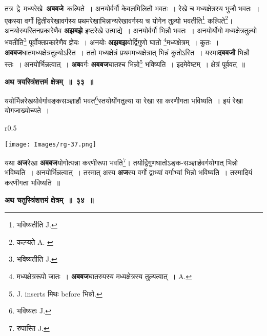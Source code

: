 \documentclass[11pt, openany]{book}
\begin{document}
तत्र \,द्वे \,मध्यरेखे \,\textbf{अबबजे} \,कल्पिते~। अनयोर्वर्गौ केवलमिलितौ भवतः~। रेखे च मध्यक्षेत्रस्य भुजौ भवतः~। एकस्या वर्गो द्वितीयरेखावर्गस्य प्रथमरेखाभिन्नान्यरेखावर्गस्य च योगेन तुल्यो भवतीति\renewcommand{\thefootnote}{१}\footnote{भविष्यतीति {\en J.}} कल्पिते\renewcommand{\thefootnote}{२}\footnote{कल्प्यते {\en A. }}\;। अनयोरुपरितनप्रकारेणैव \textbf{अझबझे} इष्टरेखे उत्पाद्ये~। अनयोर्वर्गौ भिन्नौ भवतः~। अनयोर्योगो मध्यक्षेत्रतुल्यो भवतीति\renewcommand{\thefootnote}{३}\footnote{भविष्यतीति {\en J.}} पूर्वोक्तप्रकारेणैव ज्ञेयः~। अनयोः \textbf{अझबझ}योर्द्विगुणो घातो \renewcommand{\thefootnote}{४}\footnote{मध्यक्षेत्ररूपो जातः~। \textbf{अबबज}घातरुपस्य मध्यक्षेत्रस्य तुल्यत्वात्~। {\en A.}}मध्यक्षेत्रम्~। कुतः~। \textbf{अबबज}घातमध्यक्षेत्रतुल्योऽस्ति~। ततो मध्यक्षेत्रं प्रथममध्यक्षेत्रात् भिन्नं कुतोऽस्ति~। यस्मा\textbf{दबबजौ} भिन्नौ स्तः~। अनयोर्भिन्नत्वात्~। \textbf{अब}वर्गः \textbf{अबबज}घातश्च  भिन्नो\renewcommand{\thefootnote}{५}\footnote{{\en J. inserts} मिथः {\en before} भिन्नो.} भविष्यति~। इदमेवेष्टम्~। क्षेत्रं पूर्ववत्~॥ 
\vspace{2mm}

\begin{center}
\textbf{\large अथ त्रयस्त्रिंशत्तमं क्षेत्रम्~॥~३३~॥}
\end{center}

{\ab ययोर्भिन्नरेखयोर्वर्गावङ्कसञ्ज्ञार्हौ भवत\renewcommand{\thefootnote}{६}\footnote{भविष्यतः {\en J.}}स्तयोर्योगतुल्या या रेखा सा करणीगता भविष्यति~। इयं रेखा योगजाख्योच्यते~। }\\

\begin{wrapfigure}{r}{0.5\textwidth}
\vspace{-8mm}
\begin{center}
\texttt{[image: Images/rg-37.png]}
\end{center}
\vspace{-8mm}
\end{wrapfigure}

 यथा \;\textbf{अज}रेखा \;\textbf{अबबज}योगोत्पन्ना करणीरूपा भवति\renewcommand{\thefootnote}{७}\footnote{रुपास्ति {\en J.}}\;। तयोर्द्विगुणघातोऽङ्क-सञ्ज्ञार्हवर्गयोगात् भिन्नो भविष्यति~। अनयोर्भिन्नत्वात्~। तस्मात् अस्य \textbf{अज}स्य वर्गो द्वाभ्यां वर्गाभ्यां भिन्नो भविष्यति~। तस्मादियं करणीगता भविष्यति~॥ 
\vspace{2mm}
 
\begin{center}
\textbf{\large अथ चतुस्त्रिंशत्तमं क्षेत्रम्~॥~३४~॥ }
\end{center}
\end{document}
